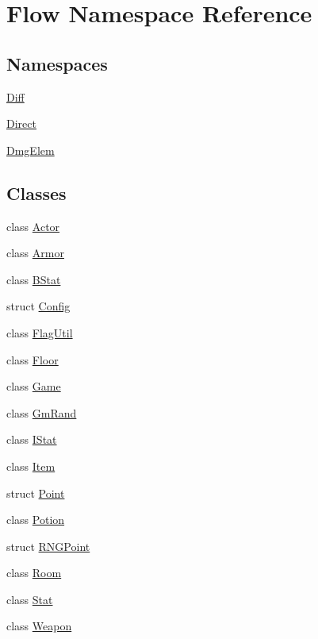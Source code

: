 \hypertarget{namespace_flow}{}\section{Flow Namespace Reference}
\label{namespace_flow}
\subsection*{Namespaces}
\begin{DoxyCompactItemize}
\item 
 \hyperlink{namespace_flow_1_1_diff}{Diff}
\item 
 \hyperlink{namespace_flow_1_1_direct}{Direct}
\item 
 \hyperlink{namespace_flow_1_1_dmg_elem}{Dmg\+Elem}
\end{DoxyCompactItemize}
\subsection*{Classes}
\begin{DoxyCompactItemize}
\item 
class \hyperlink{class_flow_1_1_actor}{Actor}
\item 
class \hyperlink{class_flow_1_1_armor}{Armor}
\item 
class \hyperlink{class_flow_1_1_b_stat}{B\+Stat}
\item 
struct \hyperlink{struct_flow_1_1_config}{Config}
\item 
class \hyperlink{class_flow_1_1_flag_util}{Flag\+Util}
\item 
class \hyperlink{class_flow_1_1_floor}{Floor}
\item 
class \hyperlink{class_flow_1_1_game}{Game}
\item 
class \hyperlink{class_flow_1_1_gm_rand}{Gm\+Rand}
\item 
class \hyperlink{class_flow_1_1_i_stat}{I\+Stat}
\item 
class \hyperlink{class_flow_1_1_item}{Item}
\item 
struct \hyperlink{struct_flow_1_1_point}{Point}
\item 
class \hyperlink{class_flow_1_1_potion}{Potion}
\item 
struct \hyperlink{struct_flow_1_1_r_n_g_point}{R\+N\+G\+Point}
\item 
class \hyperlink{class_flow_1_1_room}{Room}
\item 
class \hyperlink{class_flow_1_1_stat}{Stat}
\item 
class \hyperlink{class_flow_1_1_weapon}{Weapon}
\end{DoxyCompactItemize}

